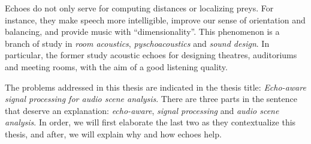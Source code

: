 \mynewline
Echoes do not only serve for computing distances or localizing preys.
For instance, they make speech more intelligible, improve our sense of orientation and balancing, and provide music with ``dimensionality''.
This phenomenon is a branch of study in \textit{room acoustics}, \textit{pyschoacoustics} and \textit{sound design}.
In particular, the former study acoustic echoes for designing theatres, auditoriums and meeting rooms, with the aim of a good listening quality.

\mynewline
The problems addressed in this thesis are indicated in the thesis title: \textit{Echo-aware signal processing for audio scene analysis}.
There are three parts in the sentence that deserve an explanation: \textit{echo-aware}, \textit{signal processing} and \textit{audio scene analysis}.
In order, we will first elaborate the last two as they contextualize this thesis, and after, we will explain why and how echoes help.


